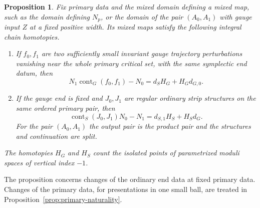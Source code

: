 \documentclass[11pt]{amsart}
\newtheorem{proposition}[theorem]{Proposition}
\theoremstyle{definition}
\theoremstyle{remark}
\theoremstyle{plain}
\numberwithin{equation}{section}
\newcommand{\cont}{\operatorname{cont}}
\begin{document}
\begin{proposition}\label{prop:end-data}
Fix primary data and the mixed domain defining a mixed map, such as
the domain defining $N_p$, or the domain of the pair $(A_0,A_1)$ with
gauge input $Z$ at a fixed positive width.
Its mixed maps satisfy the following integral chain homotopies.
\begin{enumerate}[label=(\roman*)]
\item If $f_0,f_1$ are two sufficiently small invariant gauge
trajectory perturbations vanishing near the whole primary critical
set, with the same symplectic end datum, then
\[
 N_1\cont_G(f_0,f_1)-N_0=d_S H_G+H_Gd_{G,0}.
\]
\item If the gauge end is fixed and $J_0,J_1$ are regular ordinary
strip structures on the same ordered primary pair, then
\[
 \cont_S(J_0,J_1)N_0-N_1=d_{S,1}H_S+H_Sd_G.
\]
For the pair $(A_0,A_1)$ the output pair is the product pair and the
structures and continuation are split.
\end{enumerate}
The homotopies $H_G$ and $H_S$ count the isolated points of
parametrized moduli spaces of vertical index $-1$.
\end{proposition}

The proposition concerns changes of the ordinary end data at fixed
primary data. Changes of the primary data, for presentations in one
small ball, are treated in
Proposition~\ref{prop:primary-naturality}.
\end{document}
